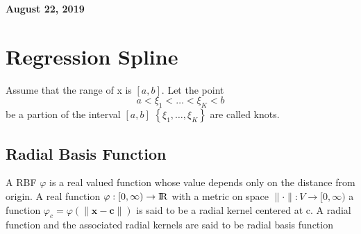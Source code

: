 \documentclass[11pt]{article}
\begin{document}
	
	
	
	\newcommand{\Ito}{$It\hat{o}$'$s~Lemma$}
	
	\newcommand\ind{\stackrel{\rm ind}{\sim}}
	\newcommand\iid{\stackrel{\rm iid}{\sim}}
	\renewcommand\c{\mathbf{c}}
	\newcommand\y{\mathbf{y}}
	\newcommand\z{\mathbf{z}}
	\renewcommand\P{\mathbf{P}}
	\newcommand\W{\mathbf{W}}
	\newcommand\X{\mathbf{X}}
	\newcommand\Y{\mathbf{Y}}
	\newcommand\Z{\mathbf{Z}}
	\newcommand\J{{\cal J}}
	\newcommand\B{{\cal B}}
	\newcommand\K{{\cal K}}
	\newcommand\N{{\rm N}}
	\newcommand\bs{\boldsymbol}
	\newcommand\bth{\bs\theta}
	\newcommand\bbe{\bs\beta}
	\renewcommand\*{^\star}
	
	\def\spacingset#1{\renewcommand{\baselinestretch}%
		{#1}\small\normalsize} \spacingset{1}
	
	
	
	\bigskip
	\bigskip
	\bigskip
	\begin{center}
		{\LARGE\bf August 22, 2019 }
	\end{center}
	\medskip
	
	
	
	\spacingset{1.45}
	
	
	
	
	
	\section{Regression Spline}
	
	Assume that the range of x is $[a,b]$. Let the point
	$$ a < \xi_1 < \dots < \xi_K < b$$
	be a partion of the interval $[a,b]$  
	$\left\{ \xi_1 , \dots , \xi_K \right\}$ are called knots.
	
	\subsection{Radial Basis Function}
	A RBF $\varphi$ is a real valued function whose value depends only on the distance from origin.
	A real function $\varphi : [0,\infty) \rightarrow {\rm I\!R}$ with a metric on space $\| \cdot \| : V \rightarrow [0,\infty)$ a function $\varphi_c = \varphi(\|\mathbf{x} - \mathbf{c}\|)$ is said to be a radial kernel centered at c. A radial function and the associated radial kernels are said to be radial basis function
	
\end{document}
